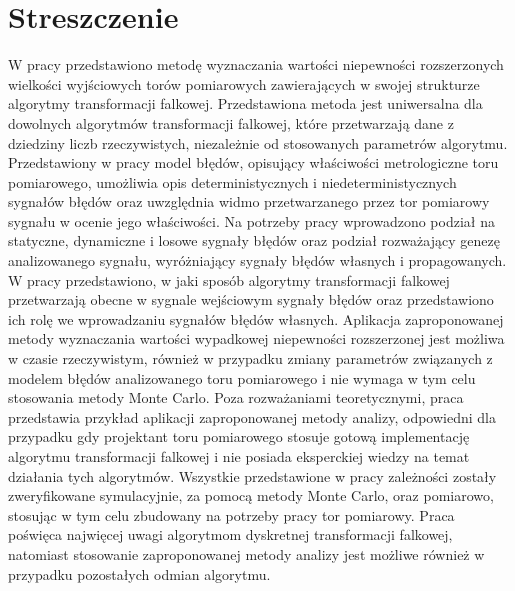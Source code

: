 \chapter*{Streszczenie}

W pracy przedstawiono metodę wyznaczania wartości niepewności rozszerzonych wielkości wyjściowych torów pomiarowych zawierających w swojej strukturze algorytmy transformacji falkowej. Przedstawiona metoda jest uniwersalna dla dowolnych algorytmów transformacji falkowej, które przetwarzają dane z dziedziny liczb rzeczywistych, niezależnie od stosowanych parametrów algorytmu. Przedstawiony w pracy model błędów, opisujący właściwości metrologiczne toru pomiarowego, umożliwia opis deterministycznych i niedeterministycznych sygnałów błędów oraz uwzględnia widmo przetwarzanego przez tor pomiarowy sygnału w ocenie jego właściwości. Na potrzeby pracy wprowadzono podział na statyczne, dynamiczne i losowe sygnały błędów oraz podział rozważający genezę analizowanego sygnału, wyróżniający sygnały błędów własnych i propagowanych. W pracy przedstawiono, w jaki sposób algorytmy transformacji falkowej przetwarzają obecne w sygnale wejściowym sygnały błędów oraz przedstawiono ich rolę we wprowadzaniu sygnałów błędów własnych. Aplikacja zaproponowanej metody wyznaczania wartości wypadkowej niepewności rozszerzonej jest możliwa w czasie rzeczywistym, również w przypadku zmiany parametrów związanych z modelem błędów analizowanego toru pomiarowego i nie wymaga w tym celu stosowania metody Monte Carlo. Poza rozważaniami teoretycznymi, praca przedstawia przykład aplikacji zaproponowanej metody analizy, odpowiedni dla przypadku gdy projektant toru pomiarowego stosuje gotową implementację algorytmu transformacji falkowej i nie posiada eksperckiej wiedzy na temat działania tych algorytmów. Wszystkie przedstawione w pracy zależności zostały zweryfikowane symulacyjnie, za pomocą metody Monte Carlo, oraz pomiarowo, stosując w tym celu zbudowany na potrzeby pracy tor pomiarowy. Praca poświęca najwięcej uwagi algorytmom dyskretnej transformacji falkowej, natomiast stosowanie zaproponowanej metody analizy jest możliwe również w przypadku pozostałych odmian algorytmu.
